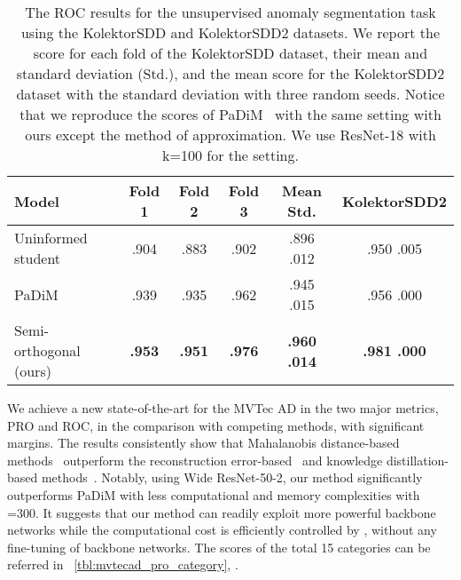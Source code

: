 \begin{table*}[t!]
  \centering
  \caption{The ROC results for the unsupervised anomaly segmentation task using the KolektorSDD and KolektorSDD2 datasets. We report the score for each fold of the KolektorSDD dataset, their mean and standard deviation (Std.), and the mean score for the KolektorSDD2 dataset with the standard deviation with three random seeds.
  Notice that we reproduce the scores of PaDiM~\cite{Defard2020} with the same setting with ours except the method of approximation. We use ResNet-18 with k=100 for the setting.
  } 
  \label{tbl:kolektor}
  \begin{tabular}{lccccc}
  \toprule
  Model                                  & Fold 1    & Fold 2    & Fold 3    & Mean  Std.      & KolektorSDD2         \\ \midrule
  Uninformed student~\cite{Bergmann2020} & .904      & .883      & .902      & .896  .012      & .950  .005      \\
  PaDiM~\cite{Defard2020}                & .939      & .935      & .962      & .945  .015      & .956  .000      \\
  Semi-orthogonal (ours)                 & \bf{.953} & \bf{.951} & \bf{.976} & \bf{.960  .014} & \bf{.981  .000} \\
  \bottomrule
  \end{tabular}
\end{table*}
 
 We achieve a new state-of-the-art for the MVTec AD in the two major metrics, PRO and ROC, in the comparison with competing methods, with significant margins. The results consistently show that Mahalanobis distance-based methods~\cite{Defard2020} outperform the reconstruction error-based~\cite{bergmann2018improving,Bergmann2019,Schlegl2017} and knowledge distillation-based methods~\cite{Bergmann2020}.
Notably, using Wide ResNet-50-2, our method significantly outperforms PaDiM with less computational and memory complexities with =300.
It suggests that our method can readily exploit more powerful backbone networks while the computational cost is efficiently controlled by , without any fine-tuning of backbone networks.
The scores of the total 15 categories can be referred in \tbl~\ref{tbl:mvtecad_pro_category}, \appx.

